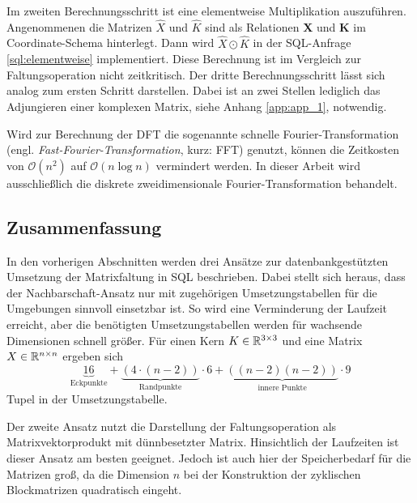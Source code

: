     

Im zweiten Berechnungsschritt ist eine elementweise Multiplikation auszuführen. Angenommenen die Matrizen $\hat{X}$ und $\hat{K}$ sind als Relationen \textbf{X}
und \textbf{K} im Coordinate-Schema hinterlegt. Dann wird $\hat{X} \odot \hat{K}$ in der SQL-Anfrage \ref{sql:elementweise} implementiert. Diese Berechnung ist im Vergleich zur Faltungsoperation nicht zeitkritisch.
Der dritte Berechnungsschritt lässt sich analog zum ersten Schritt darstellen. Dabei ist an zwei Stellen lediglich das Adjungieren einer komplexen Matrix, siehe Anhang \ref{app:app_1}, notwendig.



Wird zur Berechnung der DFT die sogenannte schnelle Fourier-Transformation (engl. \textit{Fast-Fourier-Transformation}, kurz: FFT) genutzt, können die Zeitkosten von $\mathcal{O}(n^2)$ auf $\mathcal{O}(n \log n)$ vermindert werden. In dieser Arbeit wird ausschließlich die diskrete zweidimensionale Fourier-Transformation behandelt. 

\subsection{Zusammenfassung}
\label{abs:sum_conc_in_sql}
In den vorherigen Abschnitten werden drei Ansätze zur datenbankgestützten Umsetzung der Matrixfaltung in SQL beschrieben. Dabei stellt sich heraus, dass der Nachbarschaft-Ansatz nur mit zugehörigen Umsetzungstabellen für die Umgebungen sinnvoll einsetzbar ist. So wird eine Verminderung der Laufzeit erreicht, aber die benötigten Umsetzungstabellen werden für wachsende Dimensionen schnell größer. Für einen Kern $K \in \mathbb{R}^{3 \times 3}$ und eine Matrix $X \in \mathbb{R}^{n \times n}$ ergeben sich  
\begin{equation*}
    \underbrace{16}_{\text{Eckpunkte}}+\underbrace{(4\cdot(n-2))}_{\text{Randpunkte}} \cdot 6 +\underbrace{((n-2)(n-2))}_{\text{innere Punkte}} \cdot 9
\end{equation*}
Tupel in der Umsetzungstabelle.

Der zweite Ansatz nutzt die Darstellung der Faltungsoperation als Matrixvektorprodukt mit dünnbesetzter Matrix. Hinsichtlich der Laufzeiten ist dieser Ansatz am besten geeignet. Jedoch ist auch hier der Speicherbedarf für die Matrizen groß, da die Dimension $n$ bei der Konstruktion der zyklischen Blockmatrizen quadratisch eingeht. 

